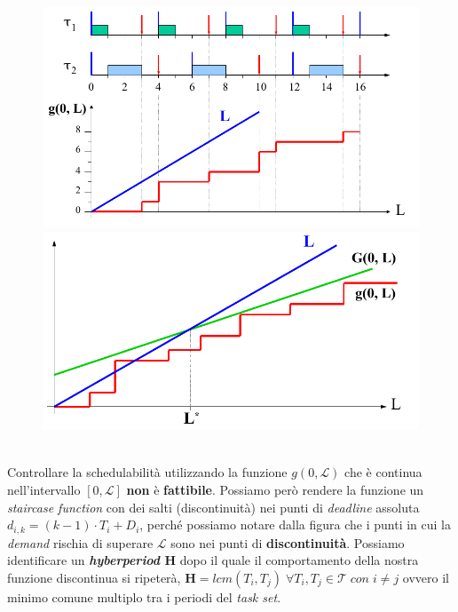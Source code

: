 \begin{figure}[h]
    \centering
    \begin{minipage}[t]{0.45\textwidth}
        \centering
        \includegraphics[width=\textwidth]{img/pdc_1}
    \end{minipage}
    \begin{minipage}[t]{0.45\textwidth}
        \centering
        \includegraphics[width=\textwidth]{img/pdc_2}
    \end{minipage}
\end{figure}
\\
Controllare la schedulabilità utilizzando la funzione $g(0, \mathcal{L})$ che è continua nell'intervallo $[0, \mathcal{L}]$ \textbf{non} è \textbf{fattibile}. Possiamo però rendere la funzione un \textit{staircase function} con dei salti (discontinuità) nei punti di \textit{deadline} assoluta $d_{i,k} = (k - 1) \cdot T_i + D_i$, perché possiamo notare dalla figura che i punti in cui la \textit{demand} rischia di superare $\mathcal{L}$ sono nei punti di \textbf{discontinuità}. Possiamo identificare un \textbf{\textit{hyberperiod} H} dopo il quale il comportamento della nostra funzione discontinua si ripeterà, $\mathbf{H} = lcm(T_i, T_j) \; \forall T_i,T_j \in \mathcal{T} \; con \; i \neq j$ ovvero il minimo comune multiplo tra i periodi del \textit{task set}. \\

